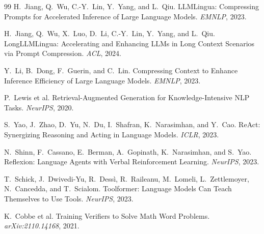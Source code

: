 \documentclass[10pt,twocolumn]{article}
\begin{document}
\begin{thebibliography}{99}
\small
{} H.~Jiang, Q.~Wu, C.-Y.~Lin, Y.~Yang, and L.~Qiu.
LLMLingua: Compressing Prompts for Accelerated Inference of Large Language Models.
\emph{EMNLP}, 2023.

 H.~Jiang, Q.~Wu, X.~Luo, D.~Li, C.-Y.~Lin,
Y.~Yang, and L.~Qiu. LongLLMLingua: Accelerating and Enhancing LLMs in Long Context
Scenarios via Prompt Compression. \emph{ACL}, 2024.

 Y.~Li, B.~Dong, F.~Guerin, and C.~Lin. Compressing
Context to Enhance Inference Efficiency of Large Language Models. \emph{EMNLP},
2023.

 P.~Lewis et al. Retrieval-Augmented Generation for
Knowledge-Intensive NLP Tasks. \emph{NeurIPS}, 2020.

 S.~Yao, J.~Zhao, D.~Yu, N.~Du, I.~Shafran, K.~Narasimhan,
and Y.~Cao. ReAct: Synergizing Reasoning and Acting in Language Models.
\emph{ICLR}, 2023.

 N.~Shinn, F.~Cassano, E.~Berman, A.~Gopinath,
K.~Narasimhan, and S.~Yao. Reflexion: Language Agents with Verbal Reinforcement
Learning. \emph{NeurIPS}, 2023.

 T.~Schick, J.~Dwivedi-Yu, R.~Dess\`i, R.~Raileanu,
M.~Lomeli, L.~Zettlemoyer, N.~Cancedda, and T.~Scialom. Toolformer: Language Models
Can Teach Themselves to Use Tools. \emph{NeurIPS}, 2023.

 K.~Cobbe et al. Training Verifiers to Solve Math Word
Problems. \emph{arXiv:2110.14168}, 2021.
\end{thebibliography}
\end{document}
